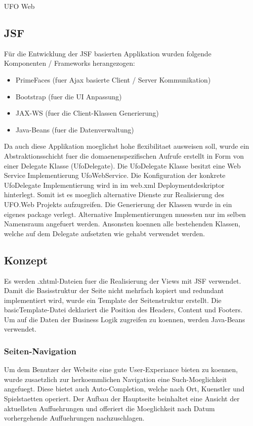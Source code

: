 \begin{section}{UFO Web}
\subsection{JSF}

Für die Entwicklung der JSF basierten Applikation wurden folgende Komponenten / Frameworks herangezogen:

\begin{itemize}
	\item PrimeFaces (fuer Ajax basierte Client / Server Kommunikation)
	\item Bootstrap (fuer die UI Anpassung)
	\item JAX-WS (fuer die Client-Klassen Generierung)
	\item Java-Beans (fuer die Datenverwaltung)
\end{itemize}

Da auch diese Applikation moeglichst hohe flexibilitaet ausweisen soll, wurde ein Abstraktionsschicht fuer die domaenenspezifischen Aufrufe erstellt in Form von einer Delegate Klasse (UfoDelegate). Die UfoDelegate Klasse besitzt eine Web Service Implementierung UfoWebService. Die Konfiguration der konkrete UfoDelegate Implementierung wird in im web.xml Deploymentdeskriptor hinterlegt. Somit ist es moeglich alternative Dienste zur Realisierung des UFO.Web Projekts aufzugreifen. Die Generierung der Klassen wurde in ein eigenes package verlegt. Alternative Implementierungen muessten nur im selben Namensraum angefuert werden. Ansonsten koennen alle bestehenden Klassen, welche auf dem Delegate aufsetzten wie gehabt verwendet werden. 

\subsection{Konzept}

Es werden .xhtml-Dateien fuer die Realisierung der Views mit JSF verwendet. Damit die Basisstruktur der Seite nicht mehrfach kopiert und redundant implementiert wird, wurde ein Template der Seitenstruktur erstellt. Die basicTemplate-Datei deklariert die Position des Headers, Content und Footers. Um auf die Daten der Business Logik zugreifen zu koennen, werden Java-Beans verwendet. 

\subsubsection{Seiten-Navigation}

Um dem Benutzer der Website eine gute User-Experiance bieten zu koennen, wurde zusaetzlich zur herkoemmlichen Navigation eine Such-Moeglichkeit angefuegt. Diese bietet auch Auto-Completion, welche nach Ort, Kuenstler und Spielstaetten operiert. Der Aufbau der Hauptseite beinhaltet eine Ansicht der aktuellsten Auffuehrungen und offeriert die Moeglichkeit nach Datum vorhergehende Auffuehrungen nachzuschlagen.


\end{section}
